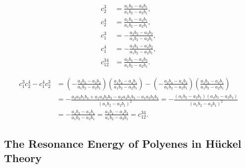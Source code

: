 \documentclass[a4paper]{book}
\newcounter{solution}[chapter]
\begin{document}
\begin{solution}
	\begin{align*}
		c^3_2 &= \frac{ a_1 b_3 - a_3 b_1 }{ a_1 b_2 - a_2 b_1 } , \\
		c^4_2 &= \frac{ a_1 b_4 - a_4 b_1 }{ a_1 b_2 - a_2 b_1 } , \\
		c^3_1 &= -\frac{ a_2 b_3 - a_3 b_2 }{ a_1 b_2 - a_2 b_1 } , \\
		c^4_1 &= -\frac{ a_2 b_4 - a_4 b_2 }{ a_1 b_2 - a_2 b_1 } , \\
		c^{34}_{12} &= \frac{ a_3 b_4 - a_4 b_3 }{ a_1 b_2 - a_2 b_1 }.
	\end{align*}
	
	\begin{align*}
		c^3_1 c^4_2 - c^4_1 c^3_2 &= \left( -\frac{ a_2 b_3 - a_3 b_2 }{ a_1 b_2 - a_2 b_1 } \right) \left( \frac{ a_1 b_4 - a_4 b_1 }{ a_1 b_2 - a_2 b_1 } \right) - \left( -\frac{ a_2 b_4 - a_4 b_2 }{ a_1 b_2 - a_2 b_1 } \right) \left( \frac{ a_1 b_3 - a_3 b_1 }{ a_1 b_2 - a_2 b_1 } \right) \\
		&= - \frac{ a_2 a_3 b_1 b_4 + a_1 a_4 b_2 b_3 - a_2 a_4 b_1 b_3 - a_1 a_3 b_2 b_4 }{ ( a_1 b_2 - a_2 b_1 )^2 } = - \frac{ ( a_1 b_2 - a_2 b_1 )( a_4 b_3 - a_3 b_4 ) }{ ( a_1 b_2 - a_2 b_1 )^2 } \\
		&= - \frac{ a_4 b_3 - a_3 b_4 }{ a_1 b_2 - a_2 b_1  } = \frac{ a_3 b_4 - a_4 b_3 }{ a_1 b_2 - a_2 b_1 } = c^{34}_{12}.
	\end{align*}
	
	\end{solution}
	
	\subsection{The Resonance Energy of Polyenes in H{\"u}ckel Theory}
	
\end{document}
